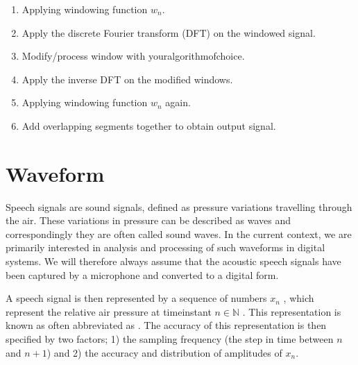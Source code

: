 \documentclass[letterpaper,10pt,english]{jupyterBook}
\begin{document}
\sphinxAtStartPar
{}
\begin{enumerate}
%
\item {} 
\sphinxAtStartPar
Applying windowing function \(w_n\).

\item {} 
\sphinxAtStartPar
Apply the discrete Fourier transform (DFT) on the windowed signal.

\item {} 
\sphinxAtStartPar
Modify/process window with your\sphinxhyphen{}algorithm\sphinxhyphen{}of\sphinxhyphen{}choice.

\item {} 
\sphinxAtStartPar
Apply the inverse DFT on the modified windows.

\item {} 
\sphinxAtStartPar
Applying windowing function \(w_n\) again.

\item {} 
\sphinxAtStartPar
Add overlapping segments together to obtain output signal.

\end{enumerate}

\sphinxstepscope


\section{Waveform}
\label{\detokenize{Representations/Waveform:waveform}}\label{\detokenize{Representations/Waveform::doc}}
\sphinxAtStartPar
Speech signals are sound signals, defined as pressure variations
travelling through the air. These variations in pressure can be
described as waves and correspondingly they are often called sound
waves. In the current context, we are primarily interested in analysis
and processing of such waveforms in digital systems. We will therefore
always assume that the acoustic speech signals have been captured by a
microphone and converted to a digital form.

\sphinxAtStartPar
A speech signal is then represented by a sequence of numbers \( x_n \)
, which represent the relative air pressure at time\sphinxhyphen{}instant \(
n\in{\mathbb N} \) .  This representation is known as  often
abbreviated as . The accuracy of this representation is then
specified by two factors; 1) the sampling frequency (the step in time
between \(n\) and \(n+1\)) and 2) the accuracy and distribution of
amplitudes of \(x_n\).
\end{document}
